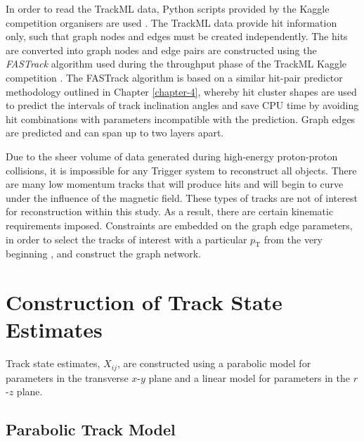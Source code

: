 In order to read the TrackML data, Python scripts provided by the Kaggle competition organisers are used \cite{python-scripts-kaggle}. The TrackML data provide hit information only, such that graph nodes and edges must be created independently. The hits are converted into graph nodes and edge pairs are constructed using the \textit{FASTrack} algorithm used during the throughput phase of the TrackML Kaggle competition \cite{Amrouche2023}. The FASTrack algorithm is based on a similar hit-pair predictor methodology outlined in Chapter \ref{chapter-4}, whereby hit cluster shapes are used to predict the intervals of track inclination angles and save CPU time by avoiding hit combinations with parameters incompatible with the prediction. Graph edges are predicted and can span up to two layers apart.

Due to the sheer volume of data generated during high-energy proton-proton collisions, it is impossible for any Trigger system to reconstruct all objects. There are many low momentum tracks that will produce hits and will begin to curve under the influence of the magnetic field. These types of tracks are not of interest for reconstruction within this study. As a result, there are certain kinematic requirements imposed. Constraints are embedded on the graph edge parameters, in order to select the tracks of interest with a particular $p_{\text{T}}$ from the very beginning \cite{Dmitry-fasttrack-addtest}, and construct the graph network. 



\section{Construction of Track State Estimates}
\label{constructing-track-states}

Track state estimates, $X_{ij}$, are constructed using a parabolic model for parameters in the transverse $x$-$y$ plane and a linear model for parameters in the $r$-$z$ plane.



\subsection{Parabolic Track Model}
\label{parabolic-state}

